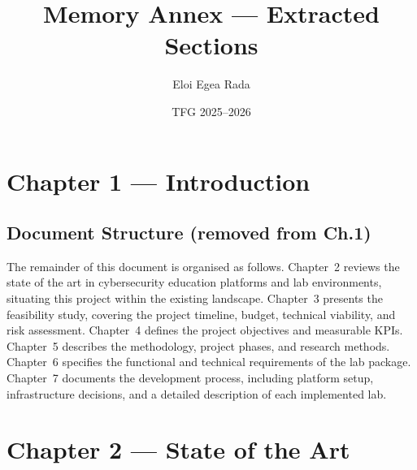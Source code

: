 \documentclass[a4paper,11pt]{article}
\title{Memory Annex --- Extracted Sections}
\author{Eloi Egea Rada}
\date{TFG 2025--2026}
\begin{document}
\maketitle
\tableofcontents
\newpage


\section{Chapter 1 --- Introduction}

\subsection{Document Structure (removed from Ch.1)}


The remainder of this document is organised as follows.
Chapter~2 reviews the state of the art in cybersecurity education platforms and
lab environments, situating this project within the existing landscape.
Chapter~3 presents the feasibility study, covering the project timeline, budget,
technical viability, and risk assessment.
Chapter~4 defines the project objectives and measurable KPIs.
Chapter~5 describes the methodology, project phases, and research methods.
Chapter~6 specifies the functional and technical requirements of the lab package.
Chapter~7 documents the development process, including platform setup, infrastructure
decisions, and a detailed description of each implemented lab.

\section{Chapter 2 --- State of the Art}
\end{document}
